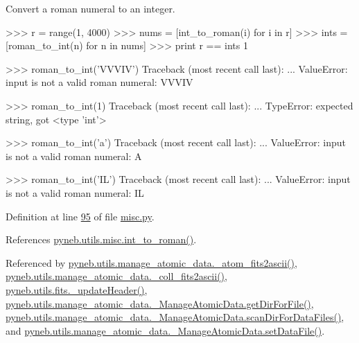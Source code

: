 \begin{DoxyVerb}Convert a roman numeral to an integer.

>>> r = range(1, 4000)
>>> nums = [int_to_roman(i) for i in r]
>>> ints = [roman_to_int(n) for n in nums]
>>> print r == ints
1

>>> roman_to_int('VVVIV')
Traceback (most recent call last):
 ...
ValueError: input is not a valid roman numeral: VVVIV

>>> roman_to_int(1)
Traceback (most recent call last):
 ...
TypeError: expected string, got <type 'int'>

>>> roman_to_int('a')
Traceback (most recent call last):
 ...
ValueError: input is not a valid roman numeral: A

>>> roman_to_int('IL')
Traceback (most recent call last):
 ...
ValueError: input is not a valid roman numeral: IL\end{DoxyVerb}
 

Definition at line \hyperlink{misc_8py_source_l00095}{95} of file \hyperlink{misc_8py_source}{misc.\-py}.



References \hyperlink{misc_8py_source_l00055}{pyneb.\-utils.\-misc.\-int\-\_\-to\-\_\-roman()}.



Referenced by \hyperlink{manage__atomic__data_8py_source_l00629}{pyneb.\-utils.\-manage\-\_\-atomic\-\_\-data.\-\_\-atom\-\_\-fits2ascii()}, \hyperlink{manage__atomic__data_8py_source_l00671}{pyneb.\-utils.\-manage\-\_\-atomic\-\_\-data.\-\_\-coll\-\_\-fits2ascii()}, \hyperlink{fits_8py_source_l00015}{pyneb.\-utils.\-fits.\-\_\-update\-Header()}, \hyperlink{manage__atomic__data_8py_source_l00144}{pyneb.\-utils.\-manage\-\_\-atomic\-\_\-data.\-\_\-\-Manage\-Atomic\-Data.\-get\-Dir\-For\-File()}, \hyperlink{manage__atomic__data_8py_source_l00358}{pyneb.\-utils.\-manage\-\_\-atomic\-\_\-data.\-\_\-\-Manage\-Atomic\-Data.\-scan\-Dir\-For\-Data\-Files()}, and \hyperlink{manage__atomic__data_8py_source_l00380}{pyneb.\-utils.\-manage\-\_\-atomic\-\_\-data.\-\_\-\-Manage\-Atomic\-Data.\-set\-Data\-File()}.


